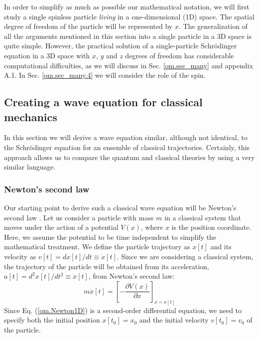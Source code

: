 \documentclass[nofootinbib, secnumarabic, amsmath, nobibnotes,11pt,aps,pra, floatfix]{revtex4-1}
\newcommand{\sref}[1]{Sec. \ref{#1}}
\newcommand{\eref}[1]{Eq. (\ref{#1})}
\begin{document}
In order to simplify as much as possible our mathematical notation,
we will first study a single spinless particle \textit{living} in a
one-dimensional (1D) space. The spatial  degree of freedom of the particle will be represented by $x$. The generalization
of all the arguments mentioned in this section into a single
particle in a 3D space is quite simple. However, the practical
solution of a single-particle Schr\"odinger equation in a 3D space with $x$, $y$ and $z$ degrees of freedom has considerable computational difficulties, as we will discuss in
\sref{om.sec_many}
and appendix A.1. In \sref{om.sec_many.4} we will consider the
role of the spin.

\subsection{Creating a wave equation for classical mechanics}\label{om.sec.single_2}

In this section we will derive a wave equation similar, although not
identical, to the Schr\"odinger equation for an ensemble of
classical trajectories. Certainly, this approach allows us to
compare the quantum and classical theories by using a very similar
language.

\subsubsection{Newton's second law}

Our starting point to derive such a classical wave equation will be
Newton's second law \cite{om.Feynmann1963}. Let us consider a particle with
mass $m$ in a classical system that moves under the action of a
potential $V(x)$, where $x$ is the position coordinate. Here, we
assume the potential to be time independent to simplify the
mathematical treatment. We define the particle trajectory as $x[t]$
and its velocity as $v[t] = dx[t]/dt\equiv\dot{x}[t]$. Since we are
considering a classical system, the trajectory of the particle will
be obtained from its acceleration, $a[t] =
d^2x[t]/dt^2\equiv\ddot{x}[t]$, from Newton's second law:
\begin{equation} \label{om.Newton1D}
m \ddot{x}[t] = \left [-\frac{\partial V(x)}{\partial x} \right ] _{x = x[t]}
\end{equation}
Since \eref{om.Newton1D} is a second-order differential equation, we need to specify both the initial position $x[t_0] = x_0$ and the initial velocity $v[t_0] = v_0$ of the particle.
\end{document}
